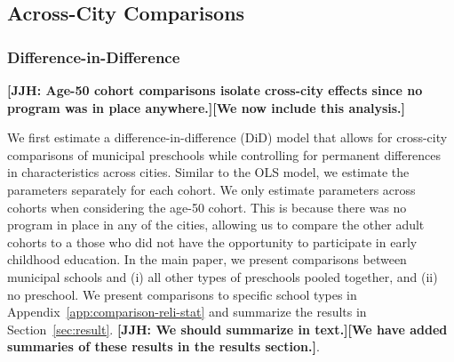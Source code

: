 

\subsection{Across-City Comparisons} \label{sec:across-city-analysis}
\subsubsection{Difference-in-Difference}  \label{subsubsection:DID}

\textbf{[JJH: Age-50 cohort comparisons isolate cross-city effects since no program was in place anywhere.][We now include this analysis.]}

We first estimate a difference-in-difference (DiD) model that allows for cross-city comparisons of municipal preschools while controlling for permanent differences in characteristics across cities. Similar to the OLS model, we estimate the parameters separately for each cohort. We only estimate parameters across cohorts when considering the age-50 cohort. This is because there was no program in place in any of the cities, allowing us to compare the other adult cohorts to a those who did not have the opportunity to participate in early childhood education. In the main paper, we present comparisons between municipal schools and (i) all other types of preschools pooled together, and (ii) no preschool. We present comparisons to specific school types in Appendix~\ref{app:comparison-reli-stat} and summarize the results in Section~\ref{sec:result}. \textbf{[JJH: We should summarize in text.][We have added summaries of these results in the results section.]}. 


